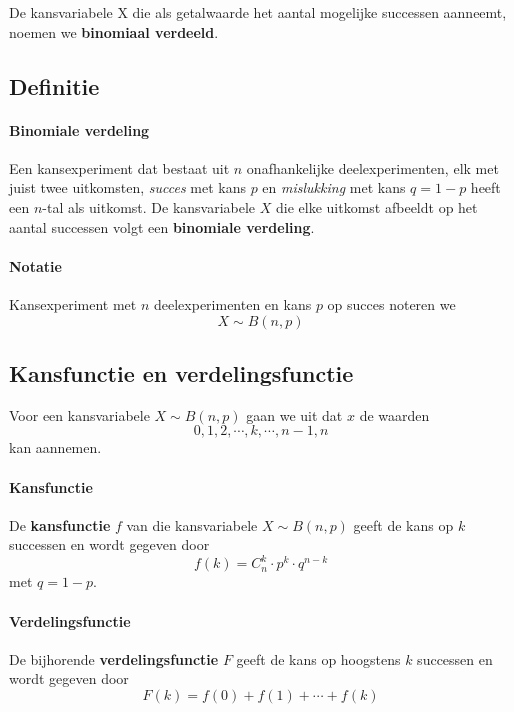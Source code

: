 \documentclass[12pt,twoside]{article}
\begin{document}
De kansvariabele X die als getalwaarde het aantal mogelijke successen aanneemt, noemen we {\bf binomiaal verdeeld}.

\subsection{Definitie}

\paragraph*{Binomiale verdeling}
\begin{mdframed}
Een kansexperiment dat bestaat uit $n$ onafhankelijke deelexperimenten, elk met juist twee uitkomsten, {\em succes} met kans $p$ en {\em mislukking} met kans $q=1-p$ heeft een $n$-tal als uitkomst. De kansvariabele $X$ die elke uitkomst afbeeldt op het aantal successen volgt een {\bf binomiale verdeling}.
\end{mdframed}

\paragraph*{Notatie} Kansexperiment met $n$ deelexperimenten en kans $p$ op succes noteren we
$$X \sim B(n, p)$$

\subsection{Kansfunctie en verdelingsfunctie}


Voor een kansvariabele $X \sim B(n, p)$ gaan we uit dat $x$ de waarden $$0, 1, 2, \cdots, k, \cdots, n-1, n$$ kan aannemen.

\paragraph*{Kansfunctie}
\begin{mdframed}
De {\bf kansfunctie} $f$ van die kansvariabele $X \sim B(n, p)$ geeft de kans op $k$ successen en wordt gegeven door
$$ f(k)=C_n^k\cdot p^k\cdot q^{n-k}$$
met $q=1-p$.
\end{mdframed}

\paragraph*{Verdelingsfunctie}
\begin{mdframed}
De bijhorende {\bf verdelingsfunctie} $F$ geeft de kans op hoogstens $k$ successen en wordt gegeven door
$$ F(k)=f(0) + f(1) + \cdots + f(k)$$
\end{mdframed}
\end{document}
